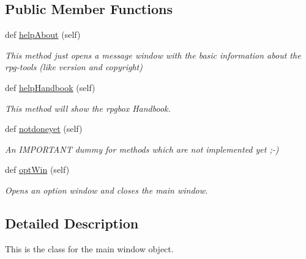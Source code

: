 \subsection*{Public Member Functions}
\begin{DoxyCompactItemize}
\item 
def \hyperlink{classgui_1_1window_1_1MainWindow_a1ec143b7290b872531eb3198bf2fd45e}{help\+About} (self)\hypertarget{classgui_1_1window_1_1MainWindow_a1ec143b7290b872531eb3198bf2fd45e}{}\label{classgui_1_1window_1_1MainWindow_a1ec143b7290b872531eb3198bf2fd45e}

\begin{DoxyCompactList}\small\item\em This method just opens a message window with the basic information about the rpg-\/tools (like version and copyright) \end{DoxyCompactList}\item 
def \hyperlink{classgui_1_1window_1_1MainWindow_adf2bcf83729f963606d64edf1f739c03}{help\+Handbook} (self)
\begin{DoxyCompactList}\small\item\em This method will show the rpgbox Handbook. \end{DoxyCompactList}\item 
def \hyperlink{classgui_1_1window_1_1MainWindow_a2d865a6aea10146f28c546bed4ae1f44}{notdoneyet} (self)\hypertarget{classgui_1_1window_1_1MainWindow_a2d865a6aea10146f28c546bed4ae1f44}{}\label{classgui_1_1window_1_1MainWindow_a2d865a6aea10146f28c546bed4ae1f44}

\begin{DoxyCompactList}\small\item\em An I\+M\+P\+O\+R\+T\+A\+NT dummy for methods which are not implemented yet ;-\/) \end{DoxyCompactList}\item 
def \hyperlink{classgui_1_1window_1_1MainWindow_adc2ac7ec0038032ab9047f57fa52ba32}{opt\+Win} (self)\hypertarget{classgui_1_1window_1_1MainWindow_adc2ac7ec0038032ab9047f57fa52ba32}{}\label{classgui_1_1window_1_1MainWindow_adc2ac7ec0038032ab9047f57fa52ba32}

\begin{DoxyCompactList}\small\item\em Opens an option window and closes the main window. \end{DoxyCompactList}\end{DoxyCompactItemize}


\subsection{Detailed Description}
This is the class for the main window object. 


